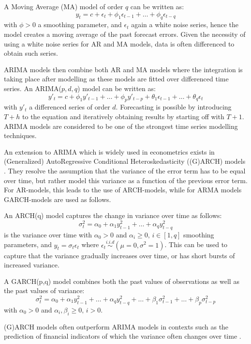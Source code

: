 A Moving Average (MA) model of order $q$ can be written as:
\[y_t=c+\epsilon_t + \phi_1\epsilon_{t-1}+\dots + \phi_q\epsilon_{t-q}\]
with $\phi>0$ a smoothing parameter, and $\epsilon_t$ again a white noise series, hence the model creates a moving average of the past forecast errors.
Given the necessity of using a white noise series for AR and MA models, data is often differenced to obtain such series.

ARIMA models then combine both AR and MA models where the integration is taking place after modelling as these models are fitted over differenced time series. 
An ARIMA($p,d,q$) model can be written as:
\[y'_t=c + \phi_1 y'_{t-1} + \dots + \phi_p y'_{t-p} + \theta_1 \epsilon_{t-1} + \dots + \theta_q \epsilon_t\]
with $y'_t$ a differenced series of order $d$.
Forecasting is possible by introducing $T+h$ to the equation and iteratively obtaining results by starting off with $T+1$.
ARIMA models are considered to be one of the strongest time series modelling techniques.

An extension to ARIMA which is widely used in econometrics exists in (Generalized) AutoRegressive Conditional Heteroskedasticity ((G)ARCH) models \cite{francq2019garch}.
They resolve the assumption that the variance of the error term has to be equal over time, but rather model this variance as a function of the previous error term.
For AR-models, this leads to the use of ARCH-models, while for ARMA models GARCH-models are used as follows.

An ARCH(q) model captures the change in variance over time as follows:
\[\sigma^2_t = \alpha_0 + \alpha_1 y^2_{t-1} + \dots + \alpha_q y^2_{t-q}\] is the variance over time
with $\alpha_0 > 0$ and $\alpha_i\geq 0,\,i\in[1,q]$ smoothing parameters, and $y_t=\sigma_t\epsilon_t$ where $\epsilon_t \overset{i.i.d}{\sim} (\mu=0, \sigma^2=1)$.
This can be used to capture that the variance  gradually increases over time, or has short bursts of increased variance.

A GARCH(p,q) model combines both the past values of observations as well as the past values of variance:
\[\sigma^2_t = \alpha_0 + \alpha_1 y^2_{t-1} + \dots + \alpha_q y^2_{t-q} + \dots + \beta_1\sigma^2_{t-1} + \dots + \beta_p\sigma^2_{t-p}\]
with $\alpha_0 > 0$ and $\alpha_i,\beta_i\geq 0,\,i>0$.

(G)ARCH models often outperform ARIMA models in contexts such as the prediction of financial indicators of which the variance often changes over time \cite{francq2019garch}.